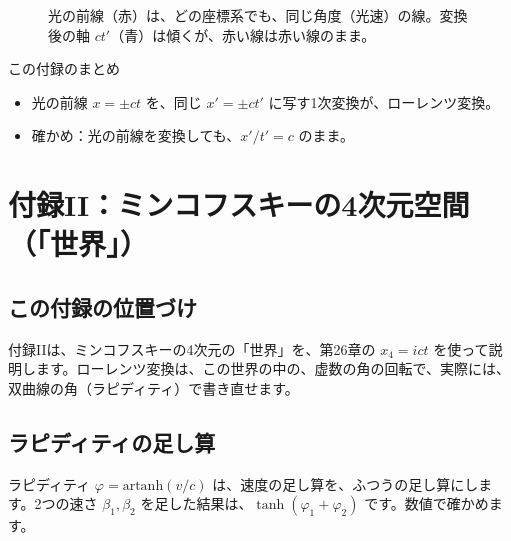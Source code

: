 \documentclass[a4paper,11pt,openany]{ltjsbook}
\begin{document}
\begin{figure}[htbp]
\centering
{}
\caption{光の前線（赤）は、どの座標系でも、同じ角度（光速）の線。変換後の軸 $ct'$（青）は傾くが、赤い線は赤い線のまま。}
\end{figure}

\begin{pointbox}{この付録のまとめ}
\begin{itemize}[leftmargin=*]
\item 光の前線 $x=\pm ct$ を、同じ $x'=\pm ct'$ に写す1次変換が、ローレンツ変換。
\item 確かめ：光の前線を変換しても、$x'/t'=c$ のまま。
\end{itemize}
\end{pointbox}

\chapter{付録II：ミンコフスキーの4次元空間（「世界」）}

\section{この付録の位置づけ}

付録IIは、ミンコフスキーの4次元の「世界」を、第26章の $x_4=ict$ を使って説明します。ローレンツ変換は、この世界の中の、虚数の角の回転で、実際には、双曲線の角（ラピディティ）で書き直せます。

\section{ラピディティの足し算}

ラピディティ $\varphi=\mathrm{artanh}(v/c)$ は、速度の足し算を、ふつうの足し算にします。2つの速さ $\beta_1,\beta_2$ を足した結果は、$\tanh(\varphi_1+\varphi_2)$ です。数値で確かめます。
\end{document}
